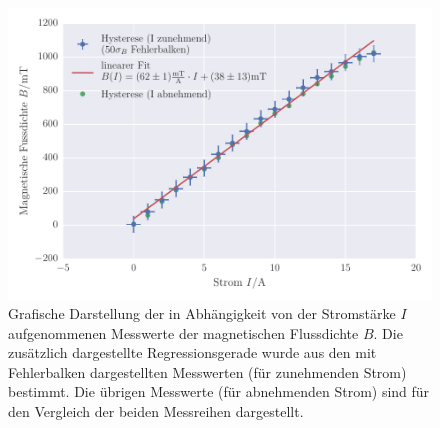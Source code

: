 \FloatBarrier
\begin{figure}[!h]
\centering
\includegraphics[scale=1]{../Grafiken/Hysterese_Messung_II_zunehmend.pdf}
\caption{Grafische Darstellung der in Abhängigkeit von der Stromstärke $I$
         aufgenommenen Messwerte der magnetischen Flussdichte $B$.
         Die zusätzlich dargestellte Regressionsgerade wurde aus den mit
         Fehlerbalken dargestellten Messwerten (für zunehmenden Strom) bestimmt.
         Die übrigen Messwerte (für abnehmenden Strom) sind für den Vergleich
         der beiden Messreihen dargestellt.\label{fig:hysterese_messung_ii_zunehmend}}
\end{figure}
\FloatBarrier
